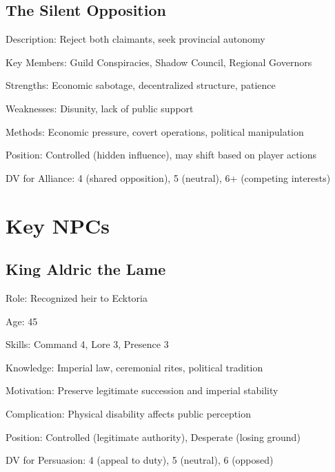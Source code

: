 \documentclass[11pt]{article}
\newenvironment{npc}[1]{\begin{description}[leftmargin=*,style=standard]\item[\textbf{#1}]}{\end{description}}
\newenvironment{faction}[1]{\begin{description}[leftmargin=*,style=standard]\item[\textbf{#1}]}{\end{description}}
\begin{document}
\subsection{The Silent Opposition}
\begin{faction}{The Silent Opposition}
\item[Description:] Reject both claimants, seek provincial autonomy
\item[Key Members:] Guild Conspiracies, Shadow Council, Regional Governors
\item[Strengths:] Economic sabotage, decentralized structure, patience
\item[Weaknesses:] Disunity, lack of public support
\item[Methods:] Economic pressure, covert operations, political manipulation
\item[Position:] Controlled (hidden influence), may shift based on player actions
\item[DV for Alliance:] 4 (shared opposition), 5 (neutral), 6+ (competing interests)
\end{faction}

\section{Key NPCs}

\subsection{King Aldric the Lame}
\begin{npc}{King Aldric the Lame}
\item[Role:] Recognized heir to Ecktoria
\item[Age:] 45
\item[Skills:] Command 4, Lore 3, Presence 3
\item[Knowledge:] Imperial law, ceremonial rites, political tradition
\item[Motivation:] Preserve legitimate succession and imperial stability
\item[Complication:] Physical disability affects public perception
\item[Position:] Controlled (legitimate authority), Desperate (losing ground)
\item[DV for Persuasion:] 4 (appeal to duty), 5 (neutral), 6 (opposed)
\end{npc}
\end{document}
